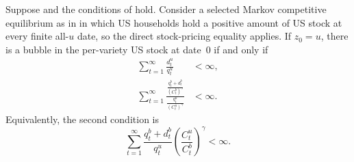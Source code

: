 \documentclass{article}
\def\green#1{#1}%
\begin{document}
\begin{thm}\label{thm_bubble_characterization}\label{thm_1}
Suppose  and the conditions of  \green{hold}. Consider a selected Markov competitive equilibrium as in  \green{in which US households hold a positive amount of US stock at every finite all-}$\green{u}$ \green{date}, \green{so the direct stock-pricing equality applies}. If $z_0=u$, there is a bubble in the per-variety US stock at date~0 if and only if
\begin{subequations}\label{thm_cond1}
\begin{align}
\sum_{t=1}^\infty \frac{d_t^u}{q_t^u}&<\infty, \label{thm_cond_1a}\\
\sum_{t=1}^\infty
\frac{\frac{q_t^b+d_t^b}{(C_t^b)^\gamma}}{\frac{q_t^u}{(C_t^u)^\gamma}}&<\infty. \label{thm_cond_1b}
\end{align}
\end{subequations}
Equivalently, the second condition is
\[
\sum_{t=1}^\infty
\frac{q_t^b+d_t^b}{q_t^u}
\left(\frac{C_t^u}{C_t^b}\right)^\gamma
<\infty.
\]
\end{thm}
\end{document}
